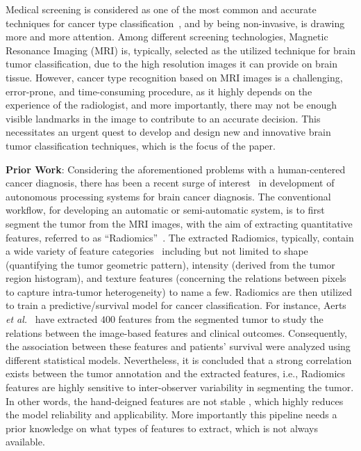 \documentclass{article}
\begin{document}
Medical screening is considered as one of the most common and accurate techniques for cancer type classification~\cite{National}, and by being non-invasive, is drawing more and more attention. Among different screening technologies, Magnetic Resonance Imaging (MRI) is, typically, selected as the utilized technique for brain tumor classification, due to the high resolution images it can provide on brain tissue. However, cancer type recognition based on MRI images is a challenging, error-prone, and time-consuming procedure, as it highly depends on the experience of the radiologist, and more importantly, there may not be enough visible landmarks in the image to contribute to an accurate decision. This necessitates an urgent quest to develop and design new and innovative brain tumor classification techniques, which is the focus of the paper.

\vspace{.025in}
\noindent
\textbf{Prior Work}:
Considering the aforementioned problems with a human-centered cancer diagnosis, there has been a recent surge of interest~\cite{Usman:2017,Abbadi:2017,Reema:2017,Mohsen:2018} in development of autonomous processing systems for brain cancer diagnosis. The conventional workflow, for developing an automatic or semi-automatic system, is to first segment the tumor from the MRI images, with the aim of extracting quantitative features, referred to as ``Radiomics''~\cite{Parnian:SPM18}. The extracted Radiomics, typically, contain a wide variety of feature categories~\cite{Oikonomou:2018} including but not limited to shape (quantifying the tumor geometric pattern), intensity (derived from the tumor region histogram), and texture features (concerning the relations between pixels to capture intra-tumor heterogeneity) to name a few. Radiomics are then utilized to train a predictive/survival model for cancer classification. For instance, Aerts \textit{et al.}~\cite{Aerts:2014} have extracted $400$ features from the segmented tumor to study the relations between the image-based features and clinical outcomes. Consequently, the association between these features and patients' survival were analyzed using different statistical models. Nevertheless, it is concluded that a strong correlation exists between the tumor annotation and the extracted features, i.e., Radiomics features are highly sensitive to inter-observer variability in segmenting the tumor. In other words, the hand-deigned features are not stable \cite{Griethuysen:2017}, which highly reduces the model reliability and applicability. More importantly this pipeline needs a prior knowledge on what types of features to extract, which is not always available.
\end{document}

